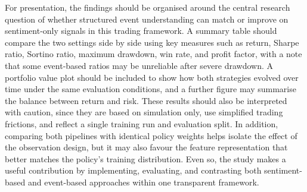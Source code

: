 \documentclass[a4paper,fleqn]{cas-sc}
\begin{document}
For presentation, the findings should be organised around the central research question of whether structured event understanding can match or improve on sentiment-only signals in this trading framework. A summary table should compare the two settings side by side using key measures such as return, Sharpe ratio, Sortino ratio, maximum drawdown, win rate, and profit factor, with a note that some event-based ratios may be unreliable after severe drawdown. A portfolio value plot should be included to show how both strategies evolved over time under the same evaluation conditions, and a further figure may summarise the balance between return and risk. These results should also be interpreted with caution, since they are based on simulation only, use simplified trading frictions, and reflect a single training run and evaluation split. In addition, comparing both pipelines with identical policy weights helps isolate the effect of the observation design, but it may also favour the feature representation that better matches the policy’s training distribution. Even so, the study makes a useful contribution by implementing, evaluating, and contrasting both sentiment-based and event-based approaches within one transparent framework.
\par\medskip
\begingroup
\noindent{}\label{tbl:performance-comparison}
\par\smallskip
\centering
\scriptsize
\setlength{\tabcolsep}{4pt}
\renewcommand{\arraystretch}{1.15}
\par\medskip
\endgroup
\end{document}
